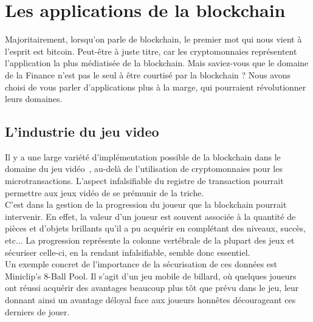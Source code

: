 \documentclass[12pt, a4paper, oneside]{book}
\begin{document}
 
    
    \chapter{Les applications de la blockchain}

    Majoritairement, lorsqu’on parle de blockchain, le premier mot qui nous vient à l’esprit est bitcoin. Peut-être à juste titre, car les cryptomonnaies représentent l’application la plus médiatisée de la blockchain. Mais saviez-vous que le domaine de la Finance n’est pas le seul à être courtisé par la blockchain ? Nous avons choisi de vous parler d’applications plus à la marge, qui pourraient révolutionner leurs domaines.

    \section{L'industrie du jeu video}

    Il y a une large variété d’implémentation possible de la blockchain dans le domaine du jeu vidéo~\cite{JV}, au-delà de l’utilisation de cryptomonnaies pour les microtransactions.  L’aspect infalsifiable du registre de transaction pourrait permettre aux jeux vidéo de se prémunir de la triche.
    \\
    C’est dans la gestion de la progression du joueur que la blockchain pourrait intervenir. En effet, la valeur d’un joueur est souvent associée à la quantité de pièces et d’objets brillants qu’il a pu acquérir en complétant des niveaux, succès, etc... La progression représente la colonne vertébrale de la plupart des jeux et sécuriser celle-ci, en la rendant infalsifiable, semble donc essentiel.
    \\
    Un exemple concret de l'importance de la sécurisation de ces données est Miniclip’s 8-Ball Pool. Il s’agit d’un jeu mobile de billard, où quelques joueurs ont réussi acquérir des avantages beaucoup plus tôt que prévu dans le jeu, leur donnant ainsi un avantage déloyal face aux joueurs honnêtes décourageant ces derniers de jouer.
    
\end{document}
